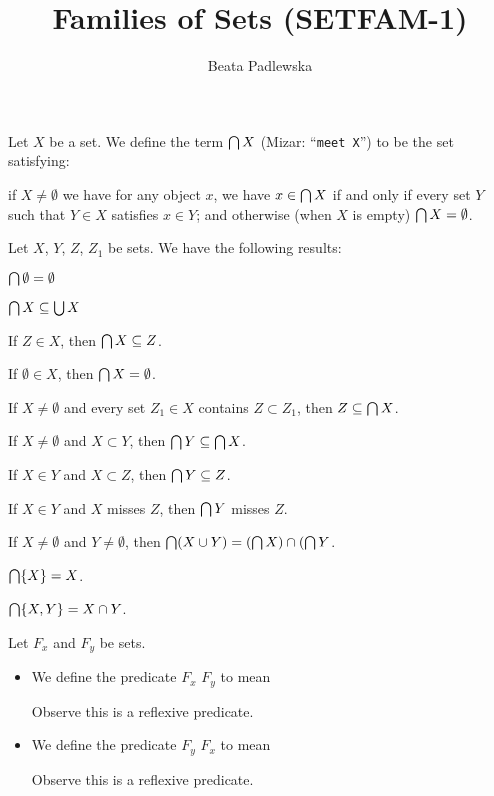 \documentclass{article}
\title{Families of Sets (SETFAM-1)}
\author{Beata Padlewska}
\begin{document}
\maketitle
\begin{definition}
Let $X$ be a set.
We define the term $\bigcap X$ (Mizar: ``\verb#meet X#'') to be the set satisfying:
\begin{defn}
\item if $X\neq\emptyset$ we have for any object $x$, we have $x\in\bigcap X$ if and only if 
  every set $Y$ such that $Y\in X$ satisfies $x\in Y$; and otherwise
  (when $X$ is empty) $\bigcap X=\emptyset$.
\end{defn}
\end{definition}

Let $X$, $Y$, $Z$, $Z_{1}$ be sets. We have the following results:
\begin{thm}
\item\label{setfam1:1} $\bigcap\emptyset=\emptyset$
\item\label{setfam1:2} $\bigcap X\subseteq\bigcup X$
\item\label{setfam1:3} If $Z\in X$, then $\bigcap X\subseteq Z$.
\item\label{setfam1:4} If $\emptyset\in X$, then $\bigcap X=\emptyset$.
\item\label{setfam1:5} If $X\neq\emptyset$ and every set $Z_{1}\in X$ contains
  $Z\subset Z_{1}$, then $Z\subseteq\bigcap X$.
\item\label{setfam1:6} If $X\neq\emptyset$ and $X\subset Y$, then $\bigcap Y\subseteq\bigcap X$.
\item\label{setfam1:7} If $X\in Y$ and $X\subset Z$, then $\bigcap Y\subseteq Z$.
\item\label{setfam1:8} If $X\in Y$ and $X$ misses $Z$,
  then $\bigcap Y$ misses $Z$.
\item\label{setfam1:9} If $X\neq\emptyset$ and $Y\neq\emptyset$,
  then $\bigcap(X\cup Y)=(\bigcap X)\cap(\bigcap Y$.
\item\label{setfam1:10} $\bigcap\{X\}=X$.
\item\label{setfam1:11} $\bigcap\{X,Y\}=X\cap Y$.
\end{thm}

\begin{definition}
Let $F_{x}$ and $F_{y}$ be sets.
\begin{itemize}
\item We define the predicate $F_{x}$  $F_{y}$ to mean
Observe this is a reflexive predicate.
\item We define the predicate $F_{y}$  $F_{x}$ to mean
Observe this is a reflexive predicate.
\end{itemize}
\end{definition}
\end{document}
